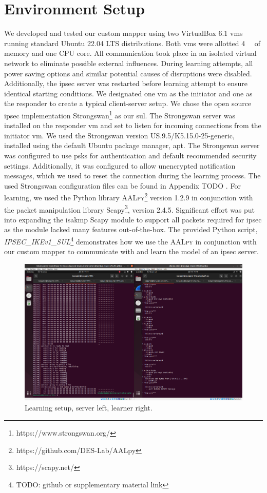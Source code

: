 \section{Environment Setup} \label{sec:learnenv}
We developed and tested our custom mapper using two VirtualBox 6.1 \acp{vm} running standard Ubuntu 22.04 LTS distributions. Both \acp{vm} were allotted \SI{4}{\giga\byte} of memory and one CPU core. All communication took place in an isolated virtual network to eliminate possible external influences. During learning attempts, all power saving options and similar potential causes of disruptions were disabled. Additionally, the \ac{ipsec} server was restarted before learning attempt to ensure identical starting conditions. We designated one \ac{vm} as the initiator and one as the responder to create a typical client-server setup. We chose the open source \ac{ipsec} implementation Strongswan\footnote{https://www.strongswan.org/} as our \ac{sul}. The Strongswan server was installed on the responder \ac{vm} and set to listen for incoming connections from the initiator \ac{vm}. We used the Strongswan version US.9.5/K5.15.0-25-generic, installed using the default Ubuntu package manager, apt. The Strongswan server was configured to use \acp{psk} for authentication and default recommended security settings. Additionally, it was configured to allow unencrypted notification messages, which we used to reset the connection during the learning process. The used Strongswan configuration files can be found in Appendix TODO . For learning, we used the Python library \textsc{AALpy}\footnote{https://github.com/DES-Lab/AALpy} version 1.2.9 in conjunction with the packet manipulation library Scapy\footnote{https://scapy.net/}, version 2.4.5. Significant effort was put into expanding the \ac{isakmp} Scapy module to support all packets required for \ac{ipsec} as the module lacked many features out-of-the-box. The provided Python script, \emph{IPSEC\_IKEv1\_SUL}\footnote{TODO: github or supplementary material link} demonstrates how we use the \textsc{AALpy} in conjunction with our custom mapper to communicate with and learn the model of an \ac{ipsec} server.

\begin{figure}
	\centering
	\includegraphics[width=\linewidth]{images/VM_setup}
	\caption{Learning setup, server left, learner right.}
	\label{fig:vmsetup}
\end{figure}

